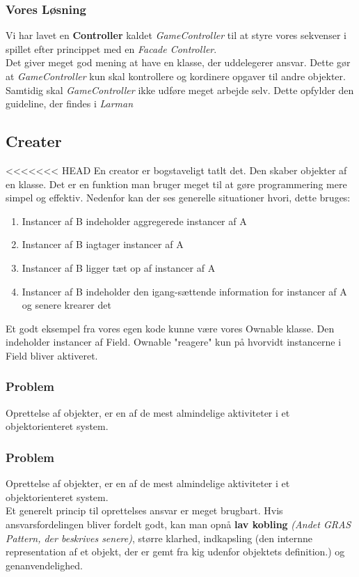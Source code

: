\subsubsection*{Vores Løsning}
Vi har lavet en \textbf{Controller} kaldet \textit{GameController} til at styre vores sekvenser i spillet efter princippet med en \textit{Facade Controller}. 
\\
Det giver meget god mening at have en klasse, der uddelegerer ansvar. Dette gør at \textit{GameController} kun skal kontrollere og kordinere opgaver til andre objekter. Samtidig skal \textit{GameController} ikke udføre meget arbejde selv. Dette opfylder den guideline, der findes i \textit{Larman}
\subsection{Creater}
<<<<<<< HEAD
En creator er bogstaveligt tatlt det. Den skaber objekter af en klasse. Det er en funktion man bruger meget til at gøre programmering mere simpel og effektiv. Nedenfor kan der ses generelle situationer hvori, dette bruges:
\begin{enumerate}
\item Instancer af B indeholder aggregerede instancer af A
\item Instancer af B iagtager instancer af A
\item Instancer af B ligger tæt op af instancer af A
\item Instancer af B indeholder den igang-sættende information for instancer af A og senere krearer det
\end{enumerate}
Et godt eksempel fra vores egen kode kunne være vores Ownable klasse. Den indeholder instancer af Field. Ownable "reagere" kun på hvorvidt instancerne i Field bliver aktiveret. 
\subsubsection*{Problem}
Oprettelse af objekter, er en af de mest almindelige aktiviteter i et objektorienteret system.
\\
\subsubsection*{Problem}
Oprettelse af objekter, er en af de mest almindelige aktiviteter i et objektorienteret system.
\\
Et generelt princip til oprettelses ansvar er meget brugbart. Hvis ansvarsfordelingen bliver fordelt godt, kan man opnå \textbf{lav kobling} \textit{(Andet GRAS Pattern, der beskrives senere)}, større klarhed, indkapsling (den internne representation af et objekt, der er gemt fra kig udenfor objektets definition.) og genanvendelighed.
